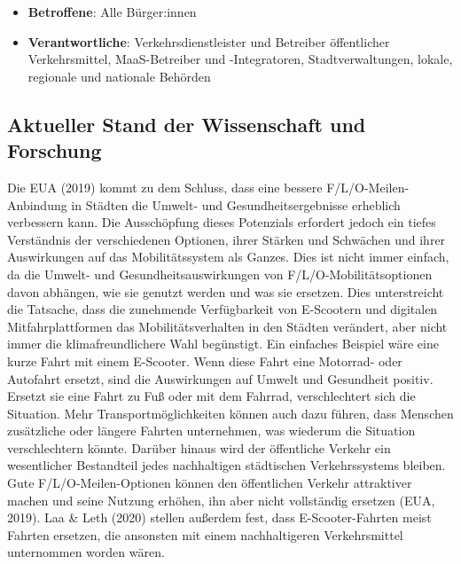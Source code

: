 \documentclass[
]{book}
\providecommand{\tightlist}{%
  \setlength{\itemsep}{0pt}\setlength{\parskip}{0pt}}
\begin{document}
\begin{itemize}
\tightlist
\item
  \textbf{Betroffene}: Alle Bürger:innen
\item
  \textbf{Verantwortliche}: Verkehrsdienstleister und Betreiber öffentlicher Verkehrsmittel, MaaS-Betreiber und -Integratoren, Stadtverwaltungen, lokale, regionale und nationale Behörden
\end{itemize}

\hypertarget{aktueller-stand-der-wissenschaft-und-forschung-22}{%
\subsection*{Aktueller Stand der Wissenschaft und Forschung}\label{aktueller-stand-der-wissenschaft-und-forschung-22}}

Die EUA (2019) kommt zu dem Schluss, dass eine bessere F/L/O-Meilen-Anbindung in Städten die Umwelt- und Gesundheitsergebnisse erheblich verbessern kann. Die Ausschöpfung dieses Potenzials erfordert jedoch ein tiefes Verständnis der verschiedenen Optionen, ihrer Stärken und Schwächen und ihrer Auswirkungen auf das Mobilitätssystem als Ganzes. Dies ist nicht immer einfach, da die Umwelt- und Gesundheitsauswirkungen von F/L/O-Mobilitätsoptionen davon abhängen, wie sie genutzt werden und was sie ersetzen. Dies unterstreicht die Tatsache, dass die zunehmende Verfügbarkeit von E-Scootern und digitalen Mitfahrplattformen das Mobilitätsverhalten in den Städten verändert, aber nicht immer die klimafreundlichere Wahl begünstigt. Ein einfaches Beispiel wäre eine kurze Fahrt mit einem E-Scooter. Wenn diese Fahrt eine Motorrad- oder Autofahrt ersetzt, sind die Auswirkungen auf Umwelt und Gesundheit positiv. Ersetzt sie eine Fahrt zu Fuß oder mit dem Fahrrad, verschlechtert sich die Situation. Mehr Transportmöglichkeiten können auch dazu führen, dass Menschen zusätzliche oder längere Fahrten unternehmen, was wiederum die Situation verschlechtern könnte. Darüber hinaus wird der öffentliche Verkehr ein wesentlicher Bestandteil jedes nachhaltigen städtischen Verkehrssystems bleiben. Gute F/L/O-Meilen-Optionen können den öffentlichen Verkehr attraktiver machen und seine Nutzung erhöhen, ihn aber nicht vollständig ersetzen (EUA, 2019). Laa \& Leth (2020) stellen außerdem fest, dass E-Scooter-Fahrten meist Fahrten ersetzen, die ansonsten mit einem nachhaltigeren Verkehrsmittel unternommen worden wären.
\end{document}
